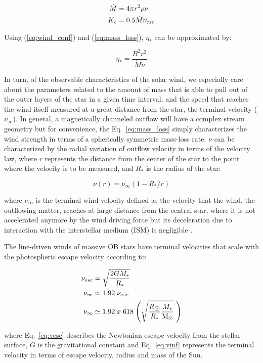 \documentclass[fleqn,usenatbib]{mnras}
\begin{document}
\begin{ceqn}
\begin{align}
    \Dot{M} &= 4\pi r^2\rho\nu \label{eq:mass_loss}\\
    K_e &= 0.5\Dot{M}\nu_{esc}
\end{align}
\end{ceqn}

Using (\ref{eq:wind_conf}) and (\ref{eq:mass_loss}), $\eta_*$ can be approximated by: 
\begin{ceqn}
\begin{equation}
    \eta_* = \frac{B^{2}r^{2}}{\Dot{M}\nu} \label{eq:wind_conf2}
\end{equation}
\end{ceqn}

In turn, of the observable characteristics of the solar wind, we especially care about the parameters related to the amount of mass that is able to pull out of the outer layers of the star in a given time interval, and the speed that reaches the wind itself measured at a great distance from the star, the terminal velocity ($\nu_\infty$). In general, a magnetically channeled outflow will have a complex stream geometry but for convenience, the Eq.~\ref{eq:mass_loss} simply characterizes the wind strength in terms of a spherically symmetric mass-loss rate. $\nu$ can be characterized by the radial variation of outflow velocity in terms of the velocity law, where $r$ represents the distance from the center of the star to the point where the velocity is to be measured, and $R_*$ is the radius of the star:
\begin{ceqn}
\begin{equation}
    \nu(r) = \nu_\infty (1-R_*/r)
\end{equation}
\end{ceqn}
where $\nu_\infty$ is the terminal wind velocity defined as the velocity that the wind, the outflowing matter, reaches at large distance from the central star, where it is not accelerated anymore by the wind driving force but its deceleration due to interaction with the interstellar medium (ISM) is negligible \citep{Niedzielski2002}.\par

The line-driven winds of massive OB stars have terminal velocities that scale with the photospheric escape velocity \citep{Lamers2000} according to:
\begin{ceqn}
\begin{align}
\nu_{esc} &= \sqrt{\frac{2GM_*}{R_*}} \label{eq:vesc} \\
\nu_\infty &\simeq 1.92 \;\nu_{esc}\\
\nu_\infty &\simeq 1.92 \; x \; 618 \; \Bigg(\sqrt{\frac{R_{\hbox{$\odot$}}}{R_*}\frac{M_*}{\mathrm{M}_\odot}} \;\Bigg) \label{eq:vinf}
\end{align}
\end{ceqn}
where Eq.~\ref{eq:vesc} describes the Newtonian escape velocity from the stellar surface, $G$ is the gravitational constant and Eq.~\ref{eq:vinf} represents the terminal velocity in terms of escape velocity, radius and mass of the Sun.\par
\end{document}
